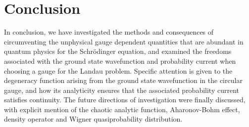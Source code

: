 \section{Conclusion}
\label{sec:conclusion}

In conclusion, we have investigated the methods and consequences of
circumventing the unphysical gauge dependent quantities that are abundant in
quantum physics for the Schr\"odinger equation, and examined the freedoms
associated with the ground state wavefunction and probability current when
choosing a gauge for the Landau problem. Specific attention is given to the
degeneracy function arising from the ground state wavefunction in the circular
gauge, and how its analyticity ensures that the associated probability current
satisfies continuity. The future directions of investigation were finally
discussed, with explicit mention of the chaotic analytic function, Aharonov-Bohm
effect, density operator and Wigner quasiprobability distribution.
